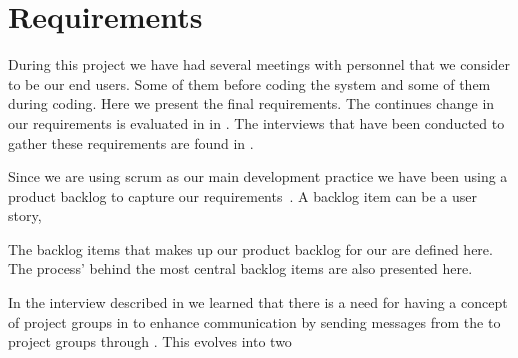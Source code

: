 \section{Requirements}
\label{sec:requirements}
During this project we have had several meetings with personnel that we consider to be our end users.
Some of them before coding the system and some of them during coding.
Here we present the final requirements.
The continues change in our requirements is evaluated in  in .
The interviews that have been conducted to gather these requirements are found in .

Since we are using scrum as our main development practice we have been using a product backlog to capture our requirements~\cite[p.~114]{Larman04}.
A backlog item can be a user story, 

The backlog items that makes up our product backlog for our \subsystem{} are defined here.
The process' behind the most central backlog items are also presented here.

In the interview described in  we learned that there is a need for having a concept of project groups in \moodle{} to enhance communication by sending messages from the \admpers{} to project groups through \moodle{}.
This evolves into two 